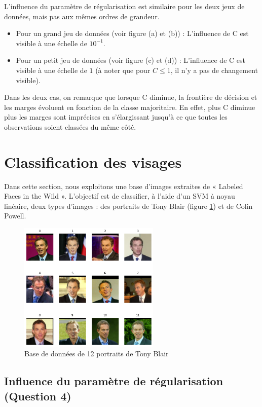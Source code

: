 \documentclass[a4paper,12pt]{article}
\begin{document}
L'influence du paramètre de régularisation est similaire pour les deux jeux de données, mais pas aux mêmes ordres de grandeur.

\begin{itemize}
    \item Pour un grand jeu de données (voir figure (a) et (b)) : L'influence de C est visible à une échelle de $10^{-1}$.
    \item Pour un petit jeu de données (voir figure (c) et (d)) : L'influence de C est visible à une échelle de $1$ (à noter que pour $C \leq 1$, il n'y a pas de changement visible).
\end{itemize}

Dans les deux cas, on remarque que lorsque C diminue, la frontière de décision et les marges évoluent en fonction de la classe majoritaire.
En effet, plus C diminue plus les marges sont imprécises en s'élargissant jusqu'à ce que toutes les observations soient classées du même côté.
\newpage

\section{Classification des visages}

Dans cette section, nous exploitons une base d'images extraites de « Labeled Faces in the Wild ».
L'objectif est de classifier, à l'aide d'un SVM à noyau linéaire, deux types d'images : des portraits de Tony Blair (figure \ref{fig : visages}) et de Colin Powell. 


\begin{figure}[H]
    \centering
    \includegraphics[width=0.6\textwidth]{Images/visages.png}
    \caption{Base de données de 12 portraits de Tony Blair}\label{fig : visages}
\end{figure}

\subsection{Influence du paramètre de régularisation (Question 4)}
\end{document}

